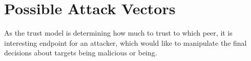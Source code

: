 \section{Possible Attack Vectors}
\label{sec:attack-vectors}
As the trust model is determining how much to trust to which peer, it is interesting endpoint for an attacker, which would like to manipulate the final decisions about targets being malicious or being.